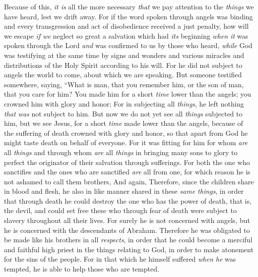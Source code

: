 \begin{biblechapter} %
 Because of this, \textit{it is} all the more necessary \textit{that} we pay attention to the \textit{things} we have heard, lest we drift away.
\verse For if the word spoken through angels was binding and every transgression and act of disobedience received a just penalty,
\verse how will we escape \textit{if we} neglect so great a salvation which had \textit{its} beginning \textit{when it} was spoken through the Lord \textit{and} was confirmed to us by those who heard,
\verse \textit{while} God was testifying at the same time by signs and wonders and various miracles and distributions of the Holy Spirit according to his will.
 For he did not subject to angels the world to come, about which we are speaking.
\verse But someone testified somewhere, saying,
\verse “What is man, that you remember him, 
or the son of man, that you care for him?
\verse You made him for a short \textit{time} lower than the angels; 
you crowned him with glory and honor;
\verse For in subjecting all \textit{things}, he left nothing \textit{that was} not subject to him. But now we do not yet see all \textit{things} subjected to him,
\verse but we see Jesus, for a short \textit{time} made lower than the angels, because of the suffering of death crowned with glory and honor, so that apart from God he might taste death on behalf of everyone.
\verse For it was fitting for him for whom \textit{are} all \textit{things} and through whom \textit{are} all \textit{things} in bringing many sons to glory to perfect the originator of their salvation through sufferings.
\verse For both the one who sanctifies and the ones who are sanctified \textit{are} all from one, for which reason he is not ashamed to call them brothers,
\verse And again,
\verse Therefore, since the children share in blood and flesh, he also in like manner shared in these \textit{same things}, in order that through death he could destroy the one who has the power of death, that is, the devil,
\verse and could set free these who through fear of death were subject to slavery throughout all their lives.
\verse For surely he is not concerned with angels, but he is concerned with the descendants of Abraham.
\verse Therefore he was obligated to be made like his brothers in all \textit{respects}, in order that he could become a merciful and faithful high priest in the things relating to God, in order to make atonement for the sins of the people.
\verse For in that which he himself suffered \textit{when he} was tempted, he is able to help those who are tempted.
\end{biblechapter}


